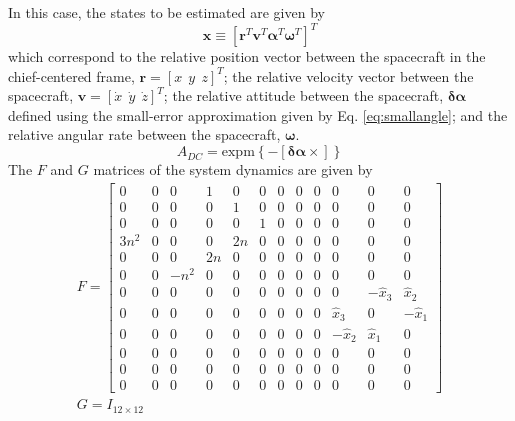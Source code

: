 \documentclass[conf]{new-aiaa}
\begin{document}
In this case, the states to be estimated are given by
\begin{equation}
    \bm{x} \equiv \left[\bm{r}^T \bm{v}^T \bm{\alpha}^T \bm{\omega}^T \right]^T
\end{equation}
which correspond to the relative position vector between the spacecraft in the chief-centered frame, $\bm r = [x\ \ y\ \ z]^T$; the relative velocity vector between the spacecraft, $\bm v = [\dot{x}\ \ \dot{y}\ \ \dot{z}]^T$; the relative attitude between the spacecraft, $\bm\delta\bm\alpha$ defined using the small-error approximation given by Eq. \eqref{eq:smallangle}; and the relative angular rate between the spacecraft, $\bm \omega$.
\begin{equation}
    A_{DC}=\text{expm}\left\lbrace-[\bm \delta \bm \alpha \times]\right\rbrace \label{eq:smallangle}
\end{equation}
The $F$ and $G$ matrices of the system dynamics are given by
\begin{subequations}
\begin{gather}
    F = \begin{bmatrix}
        0    & 0 & 0    & 1  & 0  & 0 & 0 & 0 & 0 & 0          & 0          & 0\\
        0    & 0 & 0    & 0  & 1  & 0 & 0 & 0 & 0 & 0          & 0          & 0\\
        0    & 0 & 0    & 0  & 0  & 1 & 0 & 0 & 0 & 0          & 0          & 0\\
        3n^2 & 0 & 0    & 0  & 2n & 0 & 0 & 0 & 0 & 0          & 0          & 0\\
        0    & 0 & 0    & 2n & 0  & 0 & 0 & 0 & 0 & 0          & 0          & 0\\
        0    & 0 & -n^2 & 0  & 0  & 0 & 0 & 0 & 0 & 0          & 0          & 0\\
        0    & 0 & 0    & 0  & 0  & 0 & 0 & 0 & 0 & 0          & -\hat{x}_3 & \hat{x}_2\\
        0    & 0 & 0    & 0  & 0  & 0 & 0 & 0 & 0 & \hat{x}_3  & 0          & -\hat{x}_1\\
        0    & 0 & 0    & 0  & 0  & 0 & 0 & 0 & 0 & -\hat{x}_2 & \hat{x}_1  & 0\\
        0    & 0 & 0    & 0  & 0  & 0 & 0 & 0 & 0 & 0          & 0          & 0\\
        0    & 0 & 0    & 0  & 0  & 0 & 0 & 0 & 0 & 0          & 0          & 0\\
        0    & 0 & 0    & 0  & 0  & 0 & 0 & 0 & 0 & 0          & 0          & 0
        \end{bmatrix}\\
    G = I_{12\times12}
\end{gather}
\end{subequations}
\end{document}
